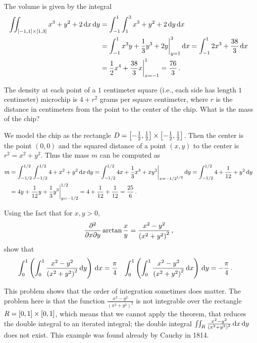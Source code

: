 \begin{solution}
The volume is given by the integral
\begin{align*}
\iint_{[-1,1]\times [1,3]} x^3 + y^2 + 2 \,\mathrm{d} x \,\mathrm{d} y
&= \int_{-1}^1 \int_1^3 x^3 + y^2 + 2 \,\mathrm{d} y \,\mathrm{d} x \\
&= \int_{-1}^1 x^3y + \frac 13 y^3 + 2y \bigg|_{y=1}^3 \,\mathrm{d} x
= \int_{-1}^1 2x^3 + \frac{38}3 \,\mathrm{d} x \\
&= \frac 12 x^4 + \frac{38}3x \bigg|_{x=-1}^1 = \frac{76}{3}\,.
\end{align*}
\end{solution}

\begin{question}
The density at each point of a $1$ centimeter square (i.e., each side has length $1$ centimeter) microchip is $4+r^2$ grams per square centimeter, where $r$ is the distance in centimeters from the point to the center of the chip. What is the mass of the chip?
\end{question}

\begin{solution}
We model the chip as the rectangle $D = \left[-\frac 12, \frac 12\right] \times \left[-\frac 12, \frac 12\right]$. Then the center is the point $(0,0)$ and the squared distance of a point $(x,y)$ to the center is $r^2 = x^2 + y^2$. Thus the mass $m$ can be computed as
\begin{align*}
m &= \int_{-1/2}^{1/2} \int_{-1/2}^{1/2} 4 + x^2 + y^2 \,\mathrm{d} x \,\mathrm{d} y
= \int_{-1/2}^{1/2} 4x + \frac 13 x^3 + xy^2 \bigg|_{x={-1/2}^{1/2}} \,\mathrm{d} y
= \int_{-1/2}^{1/2} 4 + \frac 1{12} + y^2 \,\mathrm{d} y \\
&= 4y + \frac 1{12}y + \frac 13 y^3 \bigg|_{y=-1/2}^{1/2}
= 4 + \frac 1{12} + \frac{1}{12} = \frac{25}{6}\,.
\end{align*}
\end{solution}

\begin{question}
Using the fact that for $x,y > 0$,
\[
\frac{\partial^2}{\partial x \partial y} \arctan \frac xy = \frac{x^2-y^2}{\left(x^2 + y^2 \right)^2}\,,
\]
show that
\begin{align*}
\int_0^1 \left( \int_0^1 \frac{x^2-y^2}{\left(x^2 + y^2 \right)^2} \,\mathrm{d} y \right) \,\mathrm{d} x
&= \frac \pi 4 &
\int_0^1 \left( \int_0^1 \frac{x^2-y^2}{\left(x^2 + y^2 \right)^2} \,\mathrm{d} x \right) \,\mathrm{d} y
&= -\frac \pi 4\,.
\end{align*}

\begin{note*}
This problem shows that the order of integration sometimes does matter. The problem here is that the function $\frac{x^2-y^2}{\left(x^2 + y^2 \right)^2}$ is not integrable over the rectangle $R = [0,1] \times [0,1]$, which means that we cannot apply the theorem, that reduces the double integral to an iterated integral; the double integral $\iint_R \frac{x^2-y^2}{\left(x^2 + y^2 \right)^2} \,\mathrm{d} x \,\mathrm{d} y$ does not exist. This example was found already by Cauchy in 1814.
\end{note*}
\end{question}

